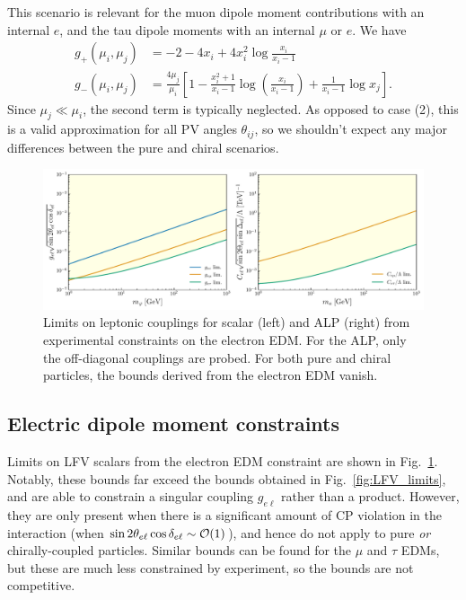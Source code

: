 {\begin{enumerate}
        This scenario is relevant for the muon dipole moment contributions with an internal $e$, and the tau dipole moments with an internal $\mu$ or $e$. We have
        \begin{align}
        g_+(\mu_i,\mu_j) &= -2 - 4x_i + 4x_i^2\log\frac{x_i}{x_i - 1}\nonumber\\
        g_-(\mu_i,\mu_j) &= \frac{4\mu_j}{\mu_i}\left[1 - \frac{x_i^2+1}{x_i - 1}\log\left(\frac{x_i}{x_i - 1}\right) + \frac{1}{x_i - 1}\log{x_j}\right].
        \end{align}
        Since $\mu_j \ll \mu_i$, the second term is typically neglected. As opposed to case (2), this is a valid approximation for all PV angles $\theta_{ij}$, so we shouldn't expect any major differences between the pure and chiral scenarios. 
\end{enumerate}

\begin{figure}[t!]
    \centering
    \includegraphics[width=\linewidth]{figures/chapter3/LFV_EDM_limits.pdf}
    \caption[Constraints on LFV scalar and ALP couplings from the lepton electric dipole moments.]{Limits on leptonic couplings for scalar (left) and ALP (right) from experimental constraints on the electron EDM. For the ALP, only the off-diagonal couplings are probed. For both pure and chiral particles, the bounds derived from the electron EDM vanish.}
    \label{fig:EDM_limits}
\end{figure}


\subsection{Electric dipole moment constraints}\label{sec:edm_limits}

Limits on LFV scalars from the electron EDM constraint are shown in Fig.~\ref{fig:EDM_limits}. Notably, these bounds far exceed the bounds obtained in Fig.~\ref{fig:LFV_limits}, and are able to constrain a singular coupling $g_{e\ell}$ rather than a product. However, they are only present when there is a significant amount of CP violation in the interaction (when $\sin{2\theta_{e\ell}}\cos{\delta_{e\ell}} \sim {\cal O}(1)$), and hence do not apply to pure {\it or} chirally-coupled particles. Similar bounds can be found for the $\mu$ and $\tau$ EDMs, but these are much less constrained by experiment, so the bounds are not competitive. 

}
